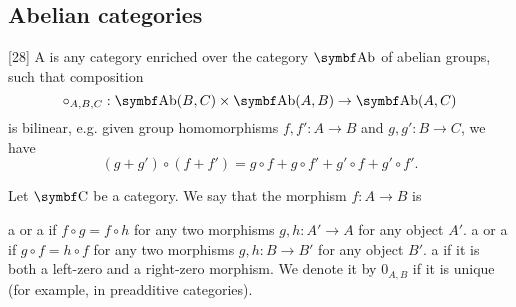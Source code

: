 \subsection{Abelian categories}\label{subsec:abelian_categories}

\begin{definition}\label{def:preadditive_category}\cite{MacLane1994}[28]
  A  is any category enriched over the category \( \Cat{Ab} \) of abelian groups, such that composition
  \begin{equation*}
    \circ_{A,B,C}: \Cat{Ab}(B, C) \times \Cat{Ab}(A, B) \to \Cat{Ab}(A, C)
  \end{equation*}
  is bilinear, e.g. given group homomorphisms \( f, f': A \to B \) and \( g, g': B \to C \), we have
  \begin{equation*}
    (g + g') \circ (f + f') = g \circ f + g \circ f' + g' \circ f + g' \circ f'.
  \end{equation*}
\end{definition}

\begin{definition}\label{def:zero_morphism}
  Let \( \Cat{C} \) be a category. We say that the morphism \( f: A \to B \) is
  \begin{defenum}
     a  or a  if \( f \circ g = f \circ h \) for any two morphisms \( g, h: A' \to A \) for any object \( A' \).
     a  or a  if \( g \circ f = h \circ f \) for any two morphisms \( g, h: B \to B' \) for any object \( B' \).
     a  if it is both a left-zero and a right-zero morphism. We denote it by \( 0_{A,B} \) if it is unique (for example, in preadditive categories).
  \end{defenum}
\end{definition}

